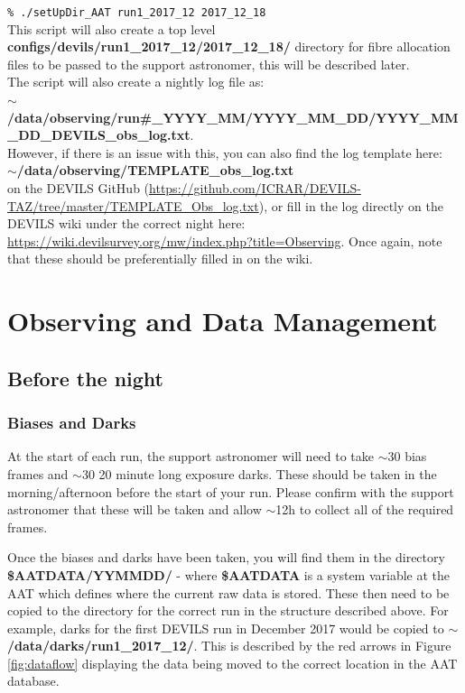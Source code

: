 \documentclass[12pt]{article}
\begin{document}
\hspace{10mm} \texttt{\% ./setUpDir\_AAT run1\_2017\_12 2017\_12\_18} \\
 
This script will also create  a top level \textbf{configs/devils/run1\_2017\_12/2017\_12\_18/} directory for fibre allocation files to be passed to the support astronomer, this will be described later. \\ 

The script will also create a nightly log file as: \\

\textbf{$\sim$/data/observing/run\#\_YYYY\_MM/YYYY\_MM\_DD/YYYY\_MM\_DD\_DEVILS\_obs\_log.txt}. \\

However, if there is an issue with this, you can also find the log template here: \\

 \textbf{$\sim$/data/observing/TEMPLATE\_obs\_log.txt} \\
 
on the DEVILS GitHub (\url{https://github.com/ICRAR/DEVILS-TAZ/tree/master/TEMPLATE\_Obs\_log.txt}), or fill in the log directly on the DEVILS wiki under the correct night here: \url{https://wiki.devilsurvey.org/mw/index.php?title=Observing}. Once again, note that these should be preferentially filled in on the wiki.   


\section{Observing and Data Management}

\subsection{Before the night}

\subsubsection{Biases and Darks}

At the start of each run, the support astronomer will need to take $\sim30$ bias frames and $\sim30$ 20 minute long exposure darks.  These should be taken in the morning/afternoon before the start of your run. Please confirm with the support astronomer that these will be taken and allow $\sim$12h to collect all of the required frames.  

Once the biases and darks have been taken, you will find them in the directory \textbf{\$AATDATA/YYMMDD/} - where \textbf{\$AATDATA} is a system variable at the AAT which defines where the current raw data is stored. These then need to be copied to the directory for the correct run in the structure described above. For example, darks  for the first DEVILS run in December 2017 would be copied to \textbf{$\sim$/data/darks/run1\_2017\_12/}. This is described by the red arrows in Figure \ref{fig:dataflow} displaying the data being moved to the correct location in the AAT database. \\   
\end{document}
